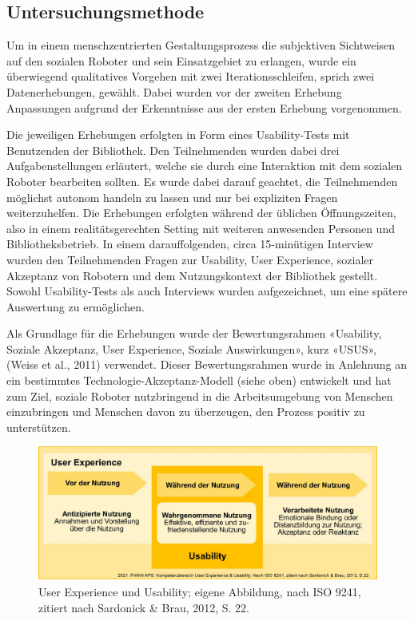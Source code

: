 \documentclass[a4paper,
fontsize=11pt,
oneside,
numbers=noperiodatend,
parskip=half-,
bibliography=totoc,
final
]{scrartcl}
\begin{document}
\hypertarget{untersuchungsmethode}{%
\subsection{Untersuchungsmethode}\label{untersuchungsmethode}}

Um in einem menschzentrierten Gestaltungsprozess die subjektiven
Sichtweisen auf den sozialen Roboter und sein Einsatzgebiet zu erlangen,
wurde ein überwiegend qualitatives Vorgehen mit zwei
Iterationsschleifen, sprich zwei Datenerhebungen, gewählt. Dabei wurden
vor der zweiten Erhebung Anpassungen aufgrund der Erkenntnisse aus der
ersten Erhebung vorgenommen.

Die jeweiligen Erhebungen erfolgten in Form eines Usability-Tests mit
Benutzenden der Bibliothek. Den Teilnehmenden wurden dabei drei
Aufgabenstellungen erläutert, welche sie durch eine Interaktion mit dem
sozialen Roboter bearbeiten sollten. Es wurde dabei darauf geachtet, die
Teilnehmenden möglichst autonom handeln zu lassen und nur bei expliziten
Fragen weiterzuhelfen. Die Erhebungen erfolgten während der üblichen
Öffnungszeiten, also in einem realitätsgerechten Setting mit weiteren
anwesenden Personen und Bibliotheksbetrieb. In einem darauffolgenden,
circa 15-minütigen Interview wurden den Teilnehmenden Fragen zur
Usability, User Experience, sozialer Akzeptanz von Robotern und dem
Nutzungskontext der Bibliothek gestellt. Sowohl Usability-Tests als auch
Interviews wurden aufgezeichnet, um eine spätere Auswertung zu
ermöglichen.

Als Grundlage für die Erhebungen wurde der Bewertungsrahmen «Usability,
Soziale Akzeptanz, User Experience, Soziale Auswirkungen», kurz «USUS»,
(Weiss et al., 2011) verwendet. Dieser Bewertungsrahmen wurde in
Anlehnung an ein bestimmtes Technologie-Akzeptanz-Modell (siehe oben)
entwickelt und hat zum Ziel, soziale Roboter nutzbringend in die
Arbeitsumgebung von Menschen einzubringen und Menschen davon zu
überzeugen, den Prozess positiv zu unterstützen.

\begin{figure}
\centering
\includegraphics[width=.8\textwidth]{img/UX-Usability.jpg}
\caption{User Experience und Usability; eigene Abbildung,
nach ISO 9241, zitiert nach Sardonick \& Brau, 2012, S. 22.}
\end{figure}
\end{document}
